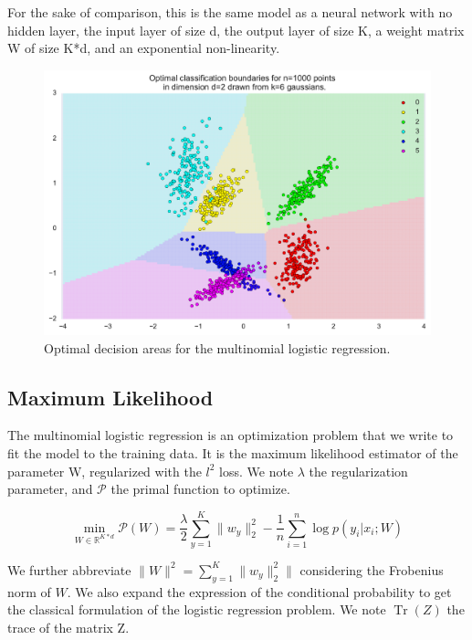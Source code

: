 \documentclass{article}
\DeclareMathOperator{\Tr}{Tr}
\begin{document}
For the sake of comparison, this is the same model as a neural network with no hidden layer, the input layer of size d, the output layer of size K, a weight matrix W of size K*d, and an exponential non-linearity.

\begin{figure}[ht]
	\label{linear classification}
	\includegraphics[width=\textwidth]{images/linear_classification.pdf}
	\caption{Optimal decision areas for the multinomial logistic regression.}
\end{figure}


 
 \subsection{Maximum Likelihood}
 
 The multinomial logistic regression is an optimization problem that we write to fit the model to the training data. It is the maximum likelihood estimator of the parameter W, regularized with the $l^2$ loss. We note $\lambda$ the regularization parameter, and $\mathscr{P}$ the primal function to optimize. 
 
 \begin{equation}
 	\min_{W \in \mathbb{R}^{K*d}} \mathscr{P}(W) = \frac{\lambda}{2}\sum_{y=1}^K  \|w_y\|_2^2 - \frac{1}{n} \sum_{i=1}^n \log p(y_i|x_i;W)
 \end{equation}
 
We further abbreviate $\|W\|^2 = \sum_{y=1}^K  \|w_y\|_2^2\|$ considering the Frobenius norm of $W$. We also expand the expression of the conditional probability to get the classical formulation of the logistic regression problem. We note $\Tr(Z)$ the trace of the matrix Z.
\end{document}
